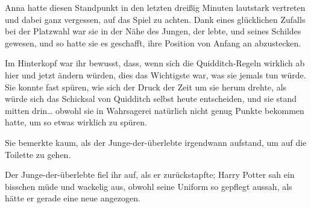 Anna hatte diesen Standpunkt in den letzten dreißig Minuten lautstark vertreten und dabei ganz vergessen, auf das Spiel zu achten. Dank eines glücklichen Zufalls bei der Platzwahl war sie in der Nähe des Jungen, der lebte, und seines Schildes gewesen, und so hatte sie es geschafft, ihre Position von Anfang an abzustecken.

Im Hinterkopf war ihr bewusst, dass, wenn sich die Quidditch-Regeln wirklich ab hier und jetzt ändern würden, dies das Wichtigste war, was sie jemals tun würde. Sie konnte fast spüren, wie sich der Druck der Zeit um sie herum drehte, als würde sich das Schicksal von Quidditch selbst heute entscheiden, und sie stand mitten drin… obwohl sie in Wahrsagerei natürlich nicht genug Punkte bekommen hatte, um so etwas wirklich zu spüren.

Sie bemerkte kaum, als der Junge-der-überlebte irgendwann aufstand, um auf die Toilette zu gehen.

Der Junge-der-überlebte fiel ihr auf, als er zurückstapfte; Harry Potter sah ein bisschen müde und wackelig aus, obwohl seine Uniform so gepflegt aussah, als hätte er gerade eine neue angezogen.

